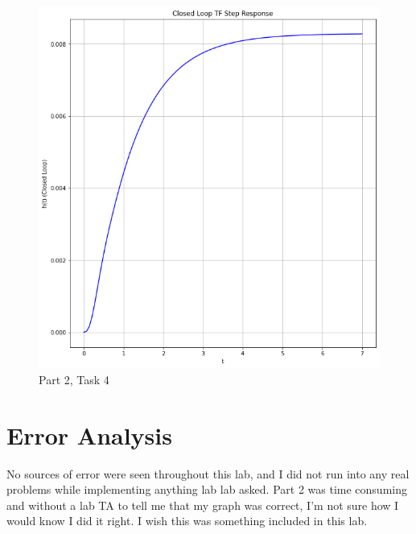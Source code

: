 \documentclass[12pt]{report}
\begin{document}
\begin{figure}[h!]
  \centering
  \includegraphics[scale=0.5]{p2t4.png}
  \caption{Part 2, Task 4}
  \label{fig: p2t4}
\end{figure}
\section{Error Analysis}\label{section: ErAn}
No sources of error were seen throughout this lab, and I did not run into any real problems while implementing anything lab lab asked. Part 2 was time consuming
and without a lab TA to tell me that my graph was correct, I'm not sure how I would know I did it right. I wish this was something included in this lab.
\end{document}
